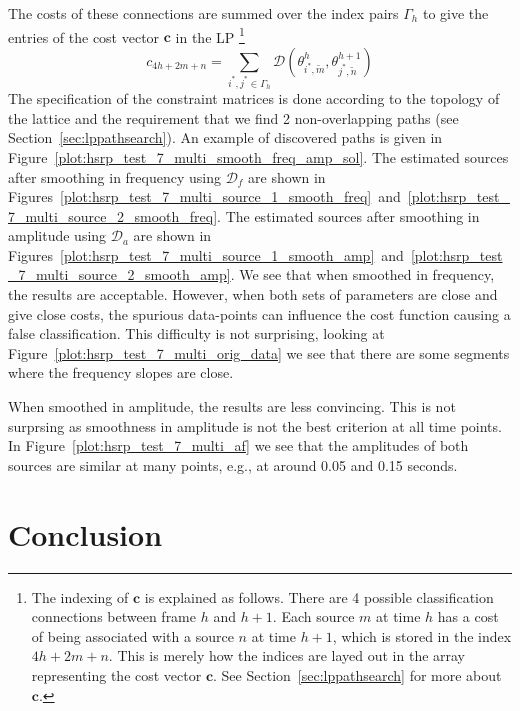 The costs of these connections
are summed over the index pairs $\Gamma_{h}$ to give the entries of the cost
vector $\boldsymbol{c}$ in the LP%
\footnote{The indexing of $\boldsymbol{c}$ is explained as follows. There are 4
    possible classification connections between frame $h$ and $h+1$. Each source
    $m$ at time $h$ has a cost of being associated with a source $n$ at time
    $h+1$, which is stored in the index $4h + 2m + n$. This is merely how the
    indices are layed out in the array representing the cost vector
    $\boldsymbol{c}$. See Section~\ref{sec:lppathsearch} for more about
    $\boldsymbol{c}$.}
\[
    c_{4h + 2m + n} = \sum_{i^{\ast},j^{\ast} \in \Gamma_{h}}
    \mathcal{D} \left( \theta_{i^{\ast},\tilde{m}}^{h}, \theta_{j^{\ast},\tilde{n}}^{h+1}
    \right)
\]
The specification of the constraint matrices is done according to the topology
of the lattice and the requirement that we find 2 non-overlapping paths (see
Section~\ref{sec:lppathsearch}). An example of discovered paths is given in
Figure~\ref{plot:hsrp_test_7_multi_smooth_freq_amp_sol}.
The estimated sources after smoothing in frequency using $\mathcal{D}_{f}$ are shown in
Figures~\ref{plot:hsrp_test_7_multi_source_1_smooth_freq}~and~\ref{plot:hsrp_test_7_multi_source_2_smooth_freq}.
The estimated sources after smoothing in amplitude using $\mathcal{D}_{a}$ are shown in
Figures~\ref{plot:hsrp_test_7_multi_source_1_smooth_amp}~and~\ref{plot:hsrp_test_7_multi_source_2_smooth_amp}.
We see that when smoothed in frequency, the results are acceptable. However,
when both sets of parameters are close and give close costs, the spurious
data-points can influence the cost function causing a false classification. This
difficulty is not surprising, looking at
Figure~\ref{plot:hsrp_test_7_multi_orig_data} we see that there are some
segments where the frequency slopes are close.

When smoothed in amplitude, the results are less convincing. This is not
surprsing as smoothness in amplitude is not the best criterion at all time
points.
In Figure~\ref{plot:hsrp_test_7_multi_af} we see that the amplitudes of
both sources are similar at many points, e.g., at around 0.05 and 0.15 seconds.

\section{Conclusion}

